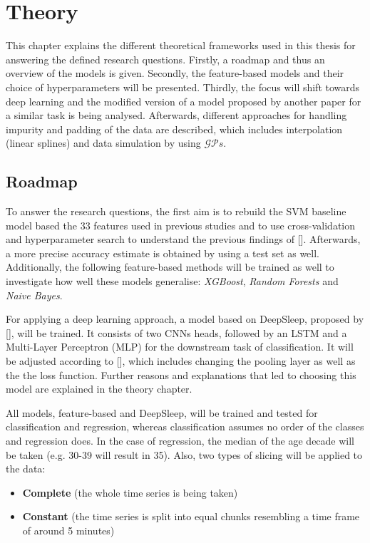 \documentclass[11pt]{scrartcl}
\begin{document}
\clearpage
\section{Theory}

This chapter explains the different theoretical frameworks used in this thesis for answering the defined research questions. Firstly, a roadmap and thus an overview of the models is given. Secondly, the feature-based models and their choice of hyperparameters will be presented. Thirdly, the focus will shift towards deep learning and the modified version of a model proposed by another paper for a similar task is being analysed. Afterwards, different approaches for handling impurity and padding of the data are described, which includes interpolation (linear splines) and data simulation by using $\mathcal{GP}s$.

\subsection{Roadmap}
\label{sec:roadmap}

To answer the research questions, the first aim is to rebuild the SVM baseline model based the $33$ features used in previous studies and to use cross-validation and hyperparameter search to understand the previous findings of [\cite{patternshrd}]. Afterwards, a more precise accuracy estimate is obtained by using a test set as well. Additionally, the following feature-based methods will be trained as well to investigate how well these models generalise: \textit{XGBoost}, \textit{Random Forests} and \textit{Naive Bayes}.

For applying a deep learning approach, a model based on DeepSleep, proposed by [\cite{deepsleep}], will be trained. It consists of two CNNs heads, followed by an LSTM and a Multi-Layer Perceptron (MLP) for the downstream task of classification. It will be adjusted according to [\cite{dlclassification}], which includes changing the pooling layer as well as the the loss function. Further reasons and explanations that led to choosing this model are explained in the theory chapter.

All models, feature-based and DeepSleep, will be trained and tested for classification and regression, whereas classification assumes no order of the classes and regression does. In the case of regression, the median of the age decade will be taken (e.g. 30-39 will result in 35). Also, two types of slicing will be applied to the data:

\begin{itemize}
    \item \textbf{Complete} (the whole time series is being taken)
    \item \textbf{Constant} (the time series is split into equal chunks resembling a time frame of around 5 minutes)
\end{itemize}
\end{document}
